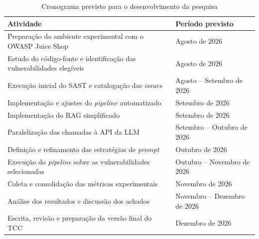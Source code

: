 \begin{table}[H]
\centering
\caption{Cronograma previsto para o desenvolvimento da pesquisa}
\label{tab:cronograma}
\renewcommand{\arraystretch}{1.35}
\begin{tabularx}{\textwidth}{|>{\raggedright\arraybackslash}X|>{\centering\arraybackslash}p{}|}
\hline
\textbf{Atividade} & \textbf{Período previsto} \\
\hline
Preparação do ambiente experimental com o OWASP Juice Shop & Agosto de 2026 \\
\hline
Estudo do código-fonte e identificação das vulnerabilidades elegíveis & Agosto de 2026 \\
\hline
Execução inicial do SAST e catalogação das \textit{issues} & Agosto -- Setembro de 2026 \\
\hline
Implementação e ajustes do \textit{pipeline} automatizado & Setembro de 2026 \\
\hline
Implementação do RAG simplificado & Setembro de 2026 \\
\hline
Paralelização das chamadas à API da LLM & Setembro -- Outubro de 2026 \\
\hline
Definição e refinamento das estratégias de \textit{prompt} & Outubro de 2026 \\
\hline
Execução do \textit{pipeline} sobre as vulnerabilidades selecionadas & Outubro -- Novembro de 2026 \\
\hline
Coleta e consolidação das métricas experimentais & Novembro de 2026 \\
\hline
Análise dos resultados e discussão dos achados & Novembro -- Dezembro de 2026 \\
\hline
Escrita, revisão e preparação da versão final do TCC & Dezembro de 2026 \\
\hline
\end{tabularx}
\end{table}
